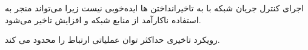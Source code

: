 \begin{boxK}
    اجرای کنترل جریان شبکه با به تاخیرانداختن
    ها ایده‌خوبی نیست زیرا می‌تواند منجر به استفاده ناکارآمد از منابع شبکه و افزایش تاخیر می‌شود.

    رویکرد
    تاخیری حداکثر توان عملیاتی ارتباط را محدود می کند.
\end{boxK}